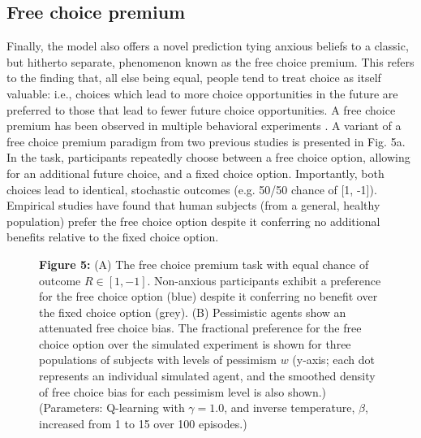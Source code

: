 \documentclass[11pt]{article} %
\begin{document}
\subsection{Free choice premium}

Finally, the model also offers a novel prediction tying anxious beliefs to a classic, but hitherto separate, phenomenon known as the free choice premium. This refers to the finding that, all else being equal, people tend to treat choice as itself valuable: i.e., choices which lead to more choice opportunities in the future are preferred to those that lead to fewer future choice opportunities. A free choice premium has been observed in multiple behavioral experiments \cite{Leotti2010, ly2019}. A variant of a free choice premium paradigm from two previous studies\cite{Leotti2011,Leotti2014} is presented in Fig. 5a. In the task, participants repeatedly choose between a free choice option, allowing for an additional future choice, and a fixed choice option. Importantly, both choices lead to identical, stochastic outcomes (e.g. 50/50 chance of [1, -1]). Empirical studies have found that human subjects (from a general, healthy population) prefer the free choice option despite it conferring no additional benefits relative to the fixed choice option. 

\begin{figure}[t]
  \centerline{%
  }
  \par \textbf{Figure 5:} (A) The free choice premium task\cite{Leotti2011,Leotti2014} with equal chance of outcome $R \in [1, -1]$. Non-anxious participants exhibit a preference for the free choice option (blue) despite it conferring no benefit over the fixed choice option (grey). (B) Pessimistic agents show an attenuated free choice bias. The fractional preference for the free choice option over the simulated experiment is shown for three populations of subjects with levels of pessimism $w$ (y-axis; each dot represents an individual simulated agent, and the smoothed density of free choice bias for each pessimism level is also shown.)
  (Parameters: Q-learning with $\gamma = 1.0$, and inverse temperature, $\beta$, increased from 1 to 15 over 100 episodes.)
\end{figure}
\end{document}
